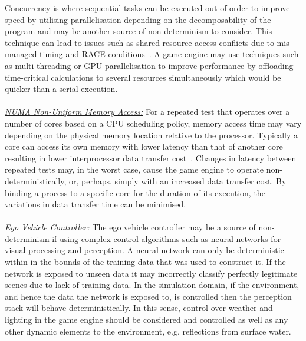 \documentclass[letterpaper, 10 pt, journal, twoside]{IEEEtran}
\begin{document}
Concurrency is where sequential tasks can be executed out of order to improve speed by utilising parallelisation depending on the decomposability of the program and may be another source of non-determinism to consider. This technique can lead to issues such as shared resource access conflicts due to mis-managed timing and RACE conditions~\cite{huffman1954synthesis}. A game engine may use techniques such as multi-threading or GPU parallelisation to improve performance by offloading time-critical calculations to several resources simultaneously which would be quicker than a serial execution.
\\\\
\noindent\underline{\textit{NUMA Non-Uniform Memory Access:}}
For a repeated test that operates over a number of cores based on a CPU scheduling policy, memory access time may vary depending on the physical memory location relative to the processor. Typically a core can access its own memory with lower latency than that of another core resulting in lower interprocessor data transfer cost~\cite{nieplocha1996global}. 
%
Changes in latency between repeated tests may, in the worst case, cause the game engine to operate non-deterministically, or, perhaps, simply with an increased data transfer cost. 
%
By binding a process to a specific core for the duration of its execution, the variations in data transfer time can be minimised.
\\\\
\noindent\underline{\textit{Ego Vehicle Controller:}}
The ego vehicle controller may be a source of non-determinism if using complex control algorithms such as neural networks for visual processing and perception. A neural network can only be deterministic within in the bounds of the training data that was used to construct it. If the network is exposed to unseen data it may incorrectly classify perfectly legitimate scenes due to lack of training data. In the simulation domain, if the environment, and hence the data the network is exposed to, is controlled then the perception stack will behave deterministically. In this sense, control over weather and lighting in the game engine should be considered and controlled as well as any other dynamic elements to the environment, e.g. reflections from surface water. 
\end{document}
